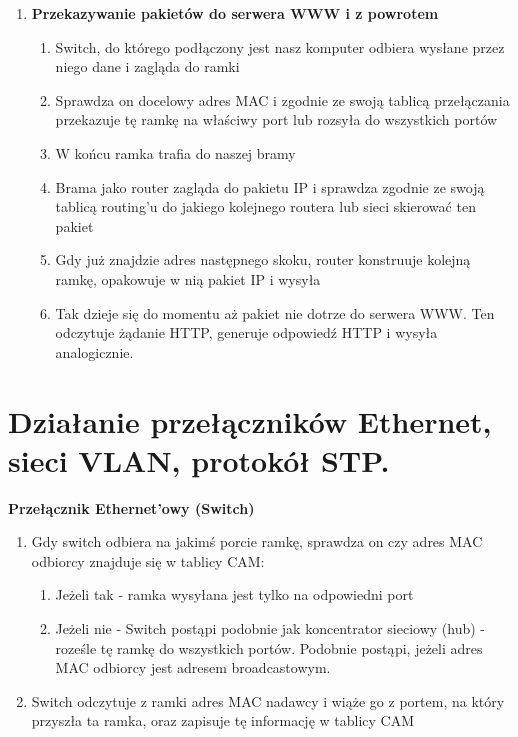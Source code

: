 \documentclass[main.tex]{subfiles}
\begin{document}
\begin{enumerate}
        \item \textbf{Przekazywanie pakietów do serwera WWW i z powrotem}
        \begin{enumerate}[noitemsep]
            \item Switch, do którego podłączony jest nasz komputer odbiera wysłane przez niego dane i zagląda do ramki
            \item Sprawdza on docelowy adres MAC i zgodnie ze swoją tablicą przełączania przekazuje tę ramkę na właściwy port
            lub rozsyła do wszystkich portów
            \item W końcu ramka trafia do naszej bramy
            \item Brama jako router zagląda do pakietu IP i sprawdza zgodnie ze swoją tablicą routing'u do jakiego
            kolejnego routera lub sieci skierować ten pakiet
            \item Gdy już znajdzie adres następnego skoku, router konstruuje kolejną ramkę, opakowuje w nią pakiet IP
            i wysyła
            \item Tak dzieje się do momentu aż pakiet nie dotrze do serwera WWW. Ten odczytuje żądanie HTTP, generuje
            odpowiedź HTTP i wysyła analogicznie.
        \end{enumerate}
    \end{enumerate}


    \section{Działanie przełączników Ethernet, sieci VLAN, protokół STP.}
    \textbf{Przełącznik Ethernet'owy (Switch)}
    \begin{enumerate}[noitemsep]
        \item Gdy switch odbiera na jakimś porcie ramkę, sprawdza on czy adres MAC odbiorcy znajduje się w tablicy CAM:
        \begin{enumerate}[noitemsep]
            \item Jeżeli tak - ramka wysyłana jest tylko na odpowiedni port
            \item Jeżeli nie - Switch postąpi podobnie jak koncentrator sieciowy (hub) - roześle tę ramkę do wszystkich
            portów. Podobnie postąpi, jeżeli adres MAC odbiorcy jest adresem broadcastowym.
        \end{enumerate}
        \item Switch odczytuje z ramki adres MAC nadawcy i wiąże go z portem, na który przyszła ta ramka, oraz zapisuje tę informację w tablicy CAM
    \end{enumerate}
\end{document}
